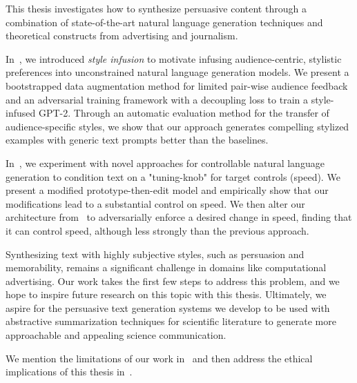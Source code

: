 This thesis investigates how to synthesize persuasive content through a combination of state-of-the-art natural language generation techniques and theoretical constructs from advertising and journalism. 

In~, we introduced \textit{style infusion} to motivate infusing audience-centric, stylistic preferences into unconstrained natural language generation models. We present a bootstrapped data augmentation method for limited pair-wise audience feedback and an adversarial training framework with a decoupling loss to train a style-infused GPT-2. Through an automatic evaluation method for the transfer of audience-specific styles, we show that our approach generates compelling stylized examples with generic text prompts better than the baselines. 

In~, we experiment with novel approaches for controllable natural language generation to condition text on a "tuning-knob" for target controls (\eg speed). We present a modified prototype-then-edit model \citep{guu2018generating} and empirically show that our modifications lead to a substantial control on speed. We then alter our architecture from~ to adversarially enforce a desired change in speed, finding that it can control speed, although less strongly than the previous approach.

Synthesizing text with highly subjective styles, such as persuasion and memorability, remains a significant challenge in domains like computational advertising. Our work takes the first few steps to address this problem, and we hope to inspire future research on this topic with this thesis. Ultimately, we aspire for the persuasive text generation systems we develop to be used with abstractive summarization techniques for scientific literature to generate more approachable and appealing science communication.

We mention the limitations of our work in~ and then address the ethical implications of this thesis in~.







